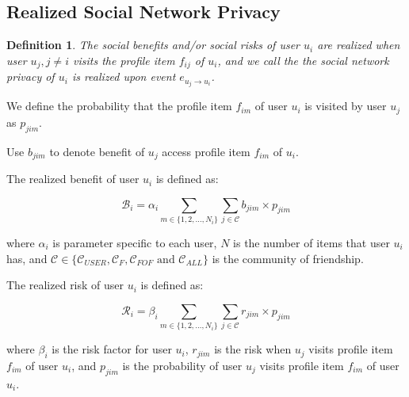 \documentclass[a4paper]{article}
\newtheorem{simondef}{Definition}
\begin{document}

\subsection{Realized Social Network Privacy}
\begin{simondef}
The social benefits and/or social risks
of user $u_i$ are realized when user $u_j, j\neq i$ visits the profile
item $f_{ij}$ of $u_i$, and we call the the social network privacy of
$u_i$ is realized upon event $e_{u_j\rightarrow u_i}$.
\end{simondef}

We define the probability that the profile item $f_{im}$ of user $u_i$
is visited by user $u_j$ as $p_{jim}$.

Use $b_{jim}$ to denote benefit of $u_j$ access profile item $f_{im}$
of $u_i$.

The realized benefit of user $u_i$ is defined as:

\[ \mathcal{B}_i = \alpha_i \sum_{m\in \{1,2,\ldots,N_i\}}\sum_{j\in
  \mathcal{C}}b_{jim}\times p_{jim} \]

where $\alpha_i$ is parameter specific to each user, $N$ is the number
of items that user $u_i$ has, and $\mathcal{C}\in \{\mathcal{C}_{USER},
\mathcal{C}_{F}, \mathcal{C}_{FOF} \mbox{ and } \mathcal{C}_{ALL}\}$
is the community of friendship.


The realized risk of user $u_i$ is defined as:

\[ \mathcal{R}_i = \beta_i \sum_{m\in \{1,2,\ldots,N_i\}}\sum_{j\in
  \mathcal{C}} r_{jim}\times p_{jim} \]

where $\beta_i$ is the risk factor for user $u_i$, $r_{jim}$ is the
risk when $u_j$ visits profile item $f_{im}$ of user $u_i$, and
$p_{jim}$ is the probability of user $u_j$ visits profile item
$f_{im}$ of user $u_i$.
\end{document}
